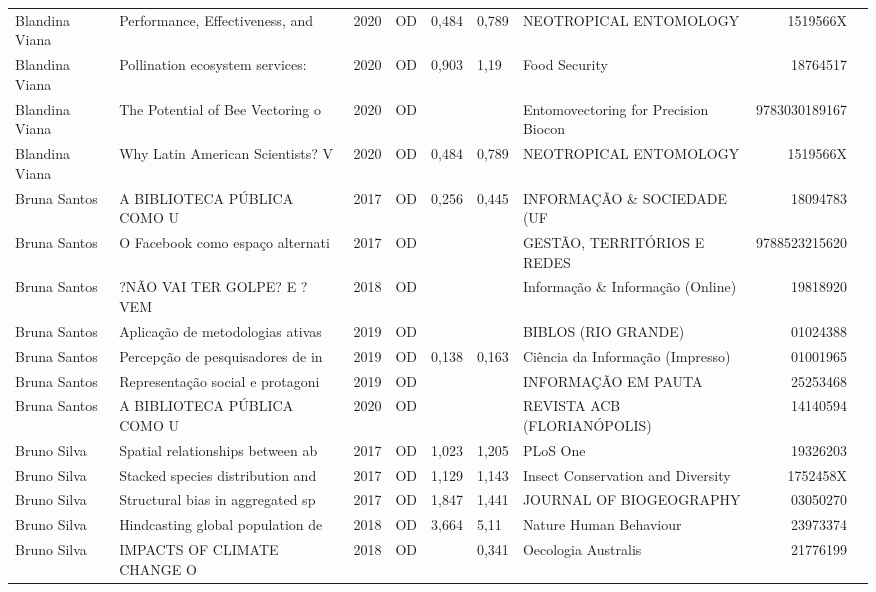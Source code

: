 \documentclass[12pt,brazil]{article}\usepackage[]{graphicx}\usepackage[]{xcolor}
\begin{document}
\begin{longtable}{lllrrllrr}
Blandina Viana & Performance, Effectiveness, and  & 2020 & OD & 0,484 & 0,789 & NEOTROPICAL ENTOMOLOGY & 1519566X \\
Blandina Viana & Pollination ecosystem services:  & 2020 & OD & 0,903 & 1,19 & Food Security & 18764517 \\
Blandina Viana & The Potential of Bee Vectoring o & 2020 & OD &  &  & Entomovectoring for Precision Biocon & 9783030189167 \\
Blandina Viana & Why Latin American Scientists? V & 2020 & OD & 0,484 & 0,789 & NEOTROPICAL ENTOMOLOGY & 1519566X \\
Bruna Santos & A BIBLIOTECA PÚBLICA COMO U & 2017 & OD & 0,256 & 0,445 & INFORMAÇÃO \& SOCIEDADE (UF & 18094783 \\
Bruna Santos & O Facebook como espaço alternati & 2017 & OD &  &  & GESTÃO, TERRITÓRIOS E REDES & 9788523215620 \\
Bruna Santos & ?NÃO VAI TER GOLPE? E ?VEM  & 2018 & OD &  &  & Informação \& Informação (Online) & 19818920 \\
Bruna Santos & Aplicação de metodologias ativas & 2019 & OD &  &  & BIBLOS (RIO GRANDE) & 01024388 \\
Bruna Santos & Percepção de pesquisadores de in & 2019 & OD & 0,138 & 0,163 & Ciência da Informação (Impresso) & 01001965 \\
Bruna Santos & Representação social e protagoni & 2019 & OD &  &  & INFORMAÇÃO EM PAUTA & 25253468 \\
\rowcolor{duplic}\rowcolor{duplic}\rowcolor{duplic}\rowcolor{duplic}\rowcolor{duplic}\rowcolor{duplic}\rowcolor{duplic}\rowcolor{duplic}\rowcolor{duplic}\rowcolor{duplic}\rowcolor{duplic}\rowcolor{duplic}\rowcolor{duplic}\rowcolor{duplic}\rowcolor{duplic}\rowcolor{duplic}Bruna Santos & A BIBLIOTECA PÚBLICA COMO U & 2020 & OD &  &  & REVISTA ACB (FLORIANÓPOLIS) & 14140594 \\
Bruno Silva & Spatial relationships between ab & 2017 & OD & 1,023 & 1,205 & PLoS One & 19326203 \\
Bruno Silva & Stacked species distribution and & 2017 & OD & 1,129 & 1,143 & Insect Conservation and Diversity & 1752458X \\
Bruno Silva & Structural bias in aggregated sp & 2017 & OD & 1,847 & 1,441 & JOURNAL OF BIOGEOGRAPHY & 03050270 \\
Bruno Silva & Hindcasting global population de & 2018 & OD & 3,664 & 5,11 & Nature Human Behaviour & 23973374 \\
Bruno Silva & IMPACTS OF CLIMATE CHANGE O & 2018 & OD &  & 0,341 & Oecologia Australis & 21776199 \\

\end{longtable}
\end{document}
